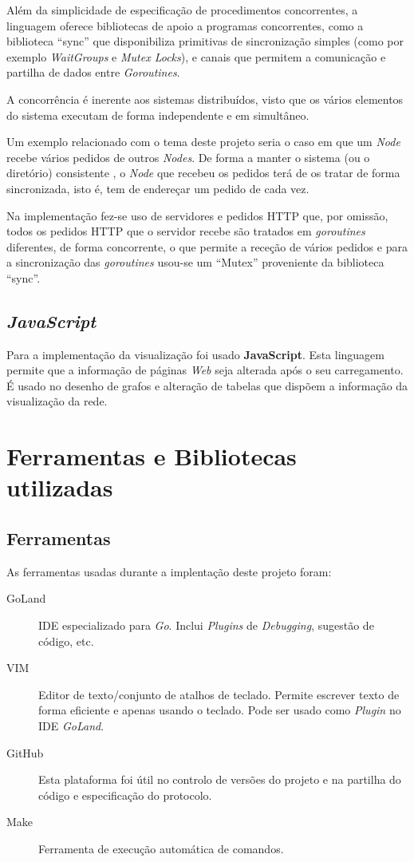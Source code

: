 Além da simplicidade de especificação de procedimentos concorrentes, a linguagem oferece bibliotecas de apoio a programas concorrentes, como a biblioteca ``sync'' que disponibiliza primitivas de sincronização simples (como por exemplo \emph{WaitGroups} e \emph{Mutex Locks}), e canais que permitem a comunicação e partilha de dados entre \emph{Goroutines}.

A concorrência é inerente aos sistemas distribuídos, visto que os vários elementos do sistema executam de forma independente e em simultâneo.

Um exemplo relacionado com o tema deste projeto seria o caso em que um \emph{Node} recebe vários pedidos de outros \emph{Nodes}. De forma a manter o sistema (ou o diretório) consistente , o \emph{Node} que recebeu os pedidos terá de os tratar de forma sincronizada, isto é, tem de endereçar um pedido de cada vez.

Na implementação fez-se uso de servidores e pedidos \acs{HTTP} que, por omissão, todos os pedidos \acs{HTTP} que o servidor recebe são tratados em \emph{goroutines} diferentes, de forma concorrente, o que permite a receção de vários pedidos e para a sincronização das \emph{goroutines} usou-se um ``Mutex'' proveniente da biblioteca ``sync''.


\subsection*{\emph{JavaScript}}
Para a implementação da visualização foi usado \textbf{JavaScript}.
Esta linguagem permite que a informação de páginas \emph{Web} seja alterada após o seu carregamento.
É usado no desenho de grafos e alteração de tabelas que dispõem a informação da visualização da rede.



\section{Ferramentas e Bibliotecas utilizadas}
\label{implementacao:sec:ferramentas_bibliotecas}
\subsection*{Ferramentas}
As ferramentas usadas durante a implentação deste projeto foram:
\begin{description}
    \item [GoLand] \acs{IDE} especializado para \emph{Go}. Inclui \emph{Plugins} de \emph{Debugging}, sugestão de código, etc.
    \item [VIM] Editor de texto/conjunto de atalhos de teclado. Permite escrever texto de forma eficiente e apenas usando o teclado. Pode ser usado como \emph{Plugin} no \acs{IDE} \emph{GoLand}.
    \item [GitHub] Esta plataforma foi útil no controlo de versões do projeto e na partilha do código e especificação do protocolo.
    \item [Make] Ferramenta de execução automática de comandos.
\end{description}

